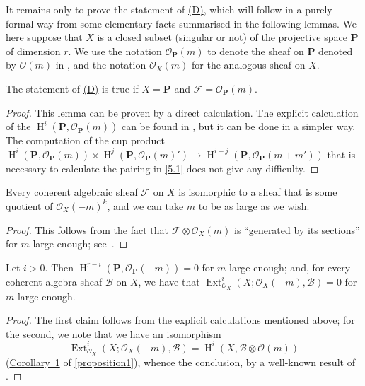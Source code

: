 \documentclass{article}
\theoremstyle{plain}
\newenvironment{lemma}[1]
  {\renewcommand\theinnercustomlemma{#1}\innercustomlemma}
  {\endinnercustomlemma}
\theoremstyle{definition}
\newcommand{\sh}{\mathscr}
\newcommand{\bb}{\mathbf}
\DeclareMathOperator{\Ext}{Ext}
\DeclareMathOperator{\HH}{H}
\begin{document}
It remains only to prove the statement of \hyperref[(D)]{(D)}, which will follow in a purely formal way from some elementary facts summarised in the following lemmas.
We here suppose that $X$ is a closed subset (singular or not) of the projective space $\bb{P}$ of dimension $r$.
We use the notation $\sh{O}_\bb{P}(m)$ to denote the sheaf on $\bb{P}$ denoted by $\sh{O}(m)$ in \cite{3}, and the notation $\sh{O}_X(m)$ for the analogous sheaf on $X$.

\begin{lemma}{2}
\label{lemma2}
  The statement of \hyperref[(D)]{(D)} is true if $X=\bb{P}$ and $\sh{F}=\sh{O}_\bb{P}(m)$.
\end{lemma}

\begin{proof}
  This lemma can be proven by a direct calculation.
  The explicit calculation of the $\HH^i(\bb{P},\sh{O}_\bb{P}(m))$ can be found in \cite{3}, but it can be done in a simpler way.
  The computation of the cup product $\HH^i(\bb{P},\sh{O}_\bb{P}(m))\times\HH^j(\bb{P},\sh{O}_\bb{P}(m)') \to \HH^{i+j}(\bb{P},\sh{O}_\bb{P}(m+m'))$ that is necessary to calculate the pairing in \cref{5.1} does not give any difficulty.
\end{proof}

\begin{lemma}{3}
\label{lemma3}
  Every coherent algebraic sheaf $\sh{F}$ on $X$ is isomorphic to a sheaf that is some quotient of $\sh{O}_X(-m)^k$, and we can take $m$ to be as large as we wish.
\end{lemma}

\begin{proof}
  This follows from the fact that $\sh{F}\otimes\sh{O}_X(m)$ is ``generated by its sections'' for $m$ large enough; see~\cite{3}.
\end{proof}

\begin{lemma}{4}
\label{lemma4}
  Let $i>0$.
  Then $\HH^{r-i}(\bb{P},\sh{O}_\bb{P}(-m))=0$ for $m$ large enough;
  and, for every coherent algebra sheaf $\sh{B}$ on $X$, we have that $\Ext_{\sh{O}_X}^i(X;\sh{O}_X(-m),\sh{B})=0$ for $m$ large enough.
\end{lemma}

\begin{proof}
  The first claim follows from the explicit calculations mentioned above;
  for the second, we note that we have an isomorphism
  \[
    \Ext_{\sh{O}_X}^i(X;\sh{O}_X(-m),\sh{B}) = \HH^i(X,\sh{B}\otimes\sh{O}(m))
  \]
  (\hyperref[proposition1corollary1]{Corollary~1} of \cref{proposition1}), whence the conclusion, by a well-known result of \cite{3}.
\end{proof}
\end{document}
